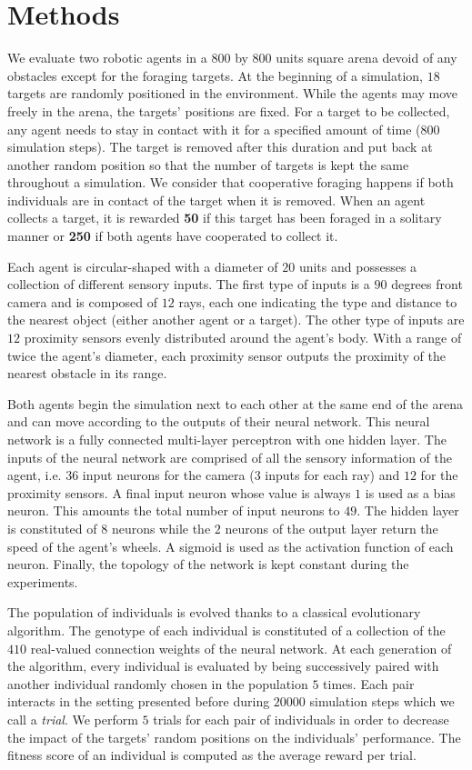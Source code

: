 \section{Methods}
\label{sec:methods}
  We evaluate two robotic agents in a $800$ by $800$ units square arena devoid of any obstacles except for the foraging targets. At the beginning of a simulation, $18$ targets are randomly positioned in the environment. While the agents may move freely in the arena, the targets' positions are fixed. For a target to be collected, any agent needs to stay in contact with it for a specified amount of time ($800$ simulation steps). The target is removed after this duration and put back at another random position so that the number of targets is kept the same throughout a simulation. We consider that cooperative foraging happens if both individuals are in contact of the target when it is removed. When an agent collects a target, it is rewarded \textbf{50} if this target has been foraged in a solitary manner or \textbf{250} if both agents have cooperated to collect it.

  Each agent is circular-shaped with a diameter of $20$ units and possesses a collection of different sensory inputs. The first type of inputs is a $90$ degrees front camera and is composed of $12$ rays, each one indicating the type and distance to the nearest object (either another agent or a target). The other type of inputs are $12$ proximity sensors evenly distributed around the agent's body. With a range of twice the agent's diameter, each proximity sensor outputs the proximity of the nearest obstacle in its range.

  Both agents begin the simulation next to each other at the same end of the arena and can move according to the outputs of their neural network. This neural network is a fully connected multi-layer perceptron with one hidden layer. The inputs of the neural network are comprised of all the sensory information of the agent, i.e. $36$ input neurons for the camera ($3$ inputs for each ray) and $12$ for the proximity sensors. A final input neuron whose value is always $1$ is used as a bias neuron. This amounts the total number of input neurons to $49$. The hidden layer is constituted of $8$ neurons while the $2$ neurons of the output layer return the speed of the agent's wheels. A sigmoid is used as the activation function of each neuron. Finally, the topology of the network is kept constant during the experiments.

  The population of individuals is evolved thanks to a classical evolutionary algorithm. The genotype of each individual is constituted of a collection of the $410$ real-valued connection weights of the neural network. At each generation of the algorithm, every individual is evaluated by being successively paired with another individual randomly chosen in the population $5$ times. Each pair interacts in the setting presented before during $20000$ simulation steps which we call a \emph{trial}. We perform $5$ trials for each pair of individuals in order to decrease the impact of the targets' random positions on the individuals' performance. The fitness score of an individual is computed as the average reward per trial.

